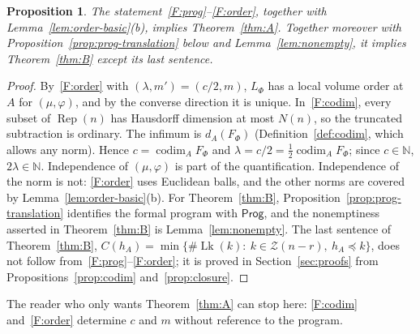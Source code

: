 \documentclass[11pt,a4paper]{article}
\newtheorem{proposition}[theorem]{Proposition}
\theoremstyle{definition}
\theoremstyle{remark}
\numberwithin{equation}{section}
\newcommand{\N}{\mathbb{N}}
\newcommand{\Rep}{\operatorname{Rep}}
\newcommand{\codim}{\operatorname{codim}}
\newcommand{\Zb}{\mathcal Z}
\newcommand{\Prog}{\mathsf{Prog}}
\newcommand{\Lk}{\operatorname{Lk}}
\begin{document}
\begin{proposition}\label{prop:formal-implies}
The statement~\ref{F:prog}--\ref{F:order}, together with Lemma~\ref{lem:order-basic}(b), implies Theorem~\ref{thm:A}. Together moreover with Proposition~\ref{prop:prog-translation} below and Lemma~\ref{lem:nonempty}, it implies Theorem~\ref{thm:B} except its last sentence.
\end{proposition}
\begin{proof}
By~\ref{F:order} with $(\lambda,m')=(c/2,m)$, $L_\Phi$ has a local volume order at $A$ for $(\mu,\varphi)$, and by the converse direction it is unique. In~\ref{F:codim}, every subset of $\Rep(n)$ has Hausdorff dimension at most $N(n)$, so the truncated subtraction is ordinary. The infimum is $d_A(F_\Phi)$ (Definition~\ref{def:codim}, which allows any norm). Hence $c=\codim_AF_\Phi$ and $\lambda=c/2=\frac12\codim_AF_\Phi$; since $c\in\N$, $2\lambda\in\N$. Independence of $(\mu,\varphi)$ is part of the quantification. Independence of the norm is not: \ref{F:order} uses Euclidean balls, and the other norms are covered by Lemma~\ref{lem:order-basic}(b). For Theorem~\ref{thm:B}, Proposition~\ref{prop:prog-translation} identifies the formal program with $\Prog$, and the nonemptiness asserted in Theorem~\ref{thm:B} is Lemma~\ref{lem:nonempty}. The last sentence of Theorem~\ref{thm:B}, $C(h_A)=\min\{\#\Lk(k):\ k\in\Zb(n-r),\ h_A\preceq k\}$, does not follow from~\ref{F:prog}--\ref{F:order}; it is proved in Section~\ref{sec:proofs} from Propositions~\ref{prop:codim} and~\ref{prop:closure}.
\end{proof}

The reader who only wants Theorem~\ref{thm:A} can stop here: \ref{F:codim} and~\ref{F:order} determine $c$ and $m$ without reference to the program.
\end{document}
